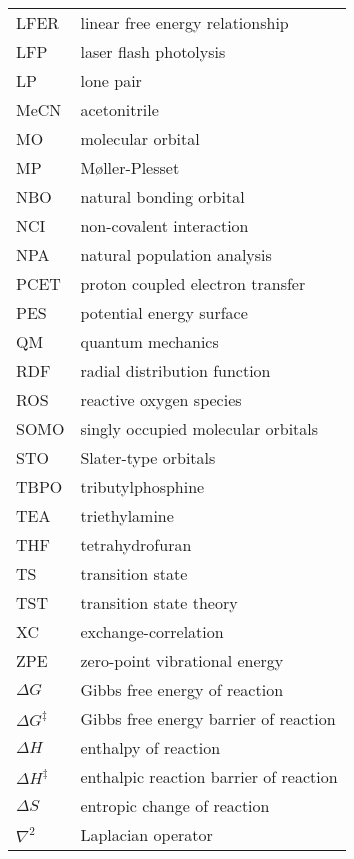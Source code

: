 \begin{longtable}{m{3cm} l}
  LFER & linear free energy relationship \\
  LFP & laser flash photolysis \\
  LP & lone pair \\
  MeCN & acetonitrile \\
  MO & molecular orbital \\
  MP & M{\o}ller-Plesset \\
  NBO & natural bonding orbital \\
  NCI & non-covalent interaction \\
  NPA & natural population analysis \\
  PCET & proton coupled electron transfer \\
  PES & potential energy surface \\
  QM & quantum mechanics \\
  RDF & radial distribution function \\
  ROS & reactive oxygen species \\
  SOMO & singly occupied molecular orbitals \\
  STO & Slater-type orbitals \\
  TBPO & tributylphosphine \\
  TEA & triethylamine \\
  THF & tetrahydrofuran \\
  TS & transition state \\
  TST & transition state theory \\
  XC & exchange-correlation \\
  ZPE & zero-point vibrational energy \\
  $\Delta G$ & Gibbs free energy of reaction  \\
  $\Delta G^{\ddagger}$ & Gibbs free energy barrier of reaction  \\
  $\Delta H$ & enthalpy of reaction  \\
  $\Delta H^{\ddagger}$ & enthalpic reaction barrier of reaction  \\
  $\Delta S$ & entropic change of reaction  \\
  $\nabla^2$ & Laplacian operator  \\
\end{longtable}
\ResumeSuspendedCounters
